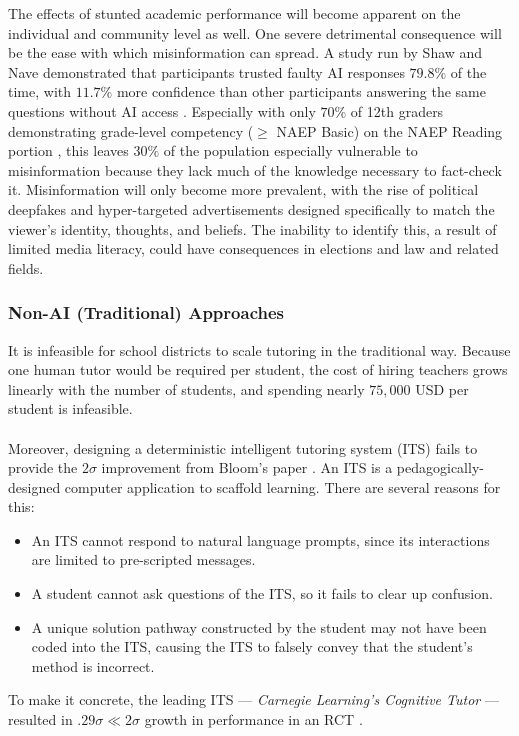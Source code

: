 \documentclass[12pt]{article}
\begin{document}
The effects of stunted academic performance will become apparent on the individual and community level as well. One severe detrimental consequence will be the ease with which misinformation can spread. A study run by Shaw and Nave demonstrated that participants trusted faulty AI responses $79.8\%$ of the time, with $11.7 \%$ more confidence than other participants answering the same questions without AI access \cite{shaw2026thinking}. Especially with only $70\%$ of 12th graders demonstrating grade-level competency ($\ge$ NAEP Basic) on the NAEP Reading portion \cite{naep2023reading12}, this leaves $30 \%$ of the population especially vulnerable to misinformation because they lack much of the knowledge necessary to fact-check it. Misinformation will only become more prevalent, with the rise of political deepfakes \cite{dale2026talarico} and hyper-targeted advertisements designed specifically to match the viewer's identity, thoughts, and beliefs. The inability to identify this, a result of limited media literacy, could have consequences in elections and law and related fields. 


\subsubsection{Non-AI (Traditional) Approaches}\label{fail}

It is infeasible for school districts to scale tutoring in the traditional way. Because one human tutor would be required per student, the cost of hiring teachers grows linearly with the number of students, and spending nearly $75,000$ USD per student is infeasible.
\\\\
Moreover, designing a deterministic intelligent tutoring system (ITS) fails to provide the $2\sigma$ improvement from Bloom's paper \cite{bloom1984sigma}. An ITS is a pedagogically-designed computer application to scaffold learning. There are several reasons for this:
\begin{itemize}
    \item An ITS cannot respond to natural language prompts, since its interactions are limited to pre-scripted messages.
    \item A student cannot ask questions of the ITS, so it fails to clear up confusion.
    \item A unique solution pathway constructed by the student may not have been coded into the ITS, causing the ITS to falsely convey that the student's method is incorrect.
\end{itemize}
To make it concrete, the leading ITS --- \emph{Carnegie Learning's Cognitive Tutor} --- resulted in $.29 \sigma \ll 2 \sigma$ growth in performance in an RCT \cite{jaciw2007cognitivetutor}.
\end{document}
